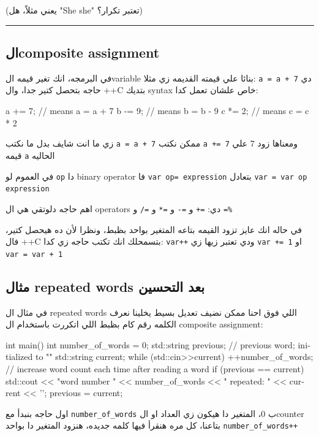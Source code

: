 \documentclass[11pt]{article}
\let\OriginalVerbatim\verbatim
\let\endOriginalVerbatim\endverbatim
\renewenvironment{verbatim}{\begin{english}\OriginalVerbatim}{\endOriginalVerbatim\end{english}}
\begin{document}
(يعني مثلاً، هل "She she" تعتبر تكرار؟)

\noindent\rule{\textwidth}{0.5pt}
\subsection{الcomposite assignment}
\label{sec:orgeeecef1}
في البرمجه، انك تغير قيمه الvariable بنائا علي قيمته القديمه زي مثلا: \texttt{a = a + 7} دي حاجه بتحصل كتير جدا، وال ++C بتديك syntax خاص علشان تعمل كدا:

\begin{verbatim}
a += 7;  // means a = a + 7
b -= 9;  // means b = b - 9
c *= 2; // means c = c * 2
\end{verbatim}

زي ما انت شايف بدل ما نكتب \texttt{a = a + 7} ممكن نكتب \texttt{a += 7} ومعناها زود 7 علي قيمه \texttt{a} الحاليه

في العموم لو \texttt{op} دا binary operator فا \texttt{var op= expression} بتعادل \texttt{var = var op expression}

اهم حاجه دلوتقي هي ال operators دي: \texttt{=+} و \texttt{=-} و \texttt{=*} و \texttt{=/} و \texttt{=\%}

في حاله انك عايز تزود القيمه بتاعه المتغير بواحد بظبط، ونظرا لأن ده هيحصل كتير، فال ++C بتسمحلك انك تكتب حاجه زي كدا: \texttt{var++} ودي تعتبر زيها زي \texttt{var += 1} او \texttt{var = var + 1}
\subsection{مثال repeated words بعد التحسين}
\label{sec:org14677f3}
في مثال ال repeated words اللي فوق احنا ممكن نضيف تعديل بسيط يخلينا نعرف الكلمه رقم كام بظبط اللي اتكررت باستخدام ال composite assignment:

\begin{verbatim}
int main() {
    int number_of_words = 0;
    std::string previous;  // previous word; initialized to ""
    std::string current;
    while (std::cin>>current) {
        ++number_of_words;  // increase word count each time after reading a word
        if (previous == current)
            std::cout << "word number " << number_of_words << " repeated: " << current << '\n';
        previous = current;
    }
}
\end{verbatim}

اول حاجه بنبدأ مع \texttt{number\_of\_words} ب 0، المتغير دا هيكون زي العداد او الcounter بتاعنا، كل مره هنقرأ فيها كلمه جديده، هنزود المتغير دا بواحد \texttt{number\_of\_words++}
\end{document}

